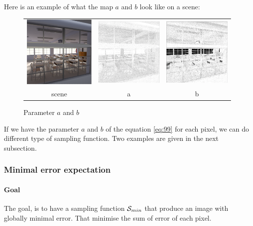 \documentclass{classeENS}
\begin{document}
Here is an example of what the map $a$ and $b$ look like on a scene:
\begin{figure}[H]
    \centering
    \caption{Parameter $a$ and $b$}
    \label{fig:a}
    \begin{tabular}{ccc}
    \includegraphics[width=45mm]{image/without/gt.png}
    & \includegraphics[width=45mm]{image/without/a.png}
    & \includegraphics[width=45mm]{image/without/b.png} \\
    scene & a & b
    \end{tabular}
\end{figure}

If we have the parameter $a$ and $b$ of the equation \ref{eq:99} for each pixel, 
we can do different type of sampling function. Two examples are given in 
the next subsection.


\subsubsection{Minimal error expectation}
\paragraph*{Goal} The goal, is to have a sampling function $\mathcal S_{min}$ that produce
 an image with globally minimal error. That minimise the sum of error of each pixel.
\end{document}
